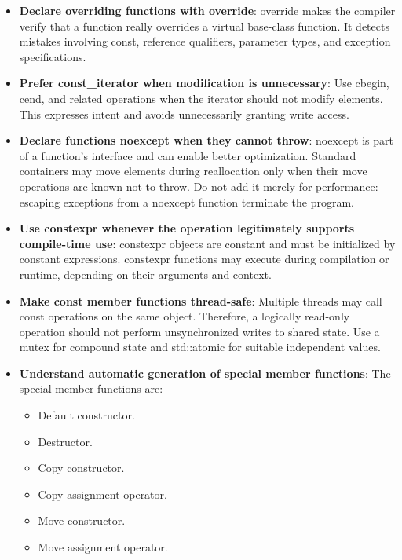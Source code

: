\documentclass{report}
\begin{document}
    \pagebreak 
    \begin{itemize}
        \item \textbf{Declare overriding functions with override}: override makes the compiler verify that a function really overrides a virtual base-class function. It detects mistakes involving const, reference qualifiers, parameter types, and exception specifications.
        \item \textbf{Prefer const\_iterator when modification is unnecessary}: Use cbegin, cend, and related operations when the iterator should not modify elements. This expresses intent and avoids unnecessarily granting write access.
        \item \textbf{Declare functions noexcept when they cannot throw}: noexcept is part of a function’s interface and can enable better optimization. Standard containers may move elements during reallocation only when their move operations are known not to throw.
            \bigbreak \noindent 
            Do not add it merely for performance: escaping exceptions from a noexcept function terminate the program.
        \item \textbf{Use constexpr whenever the operation legitimately supports compile-time use}: constexpr objects are constant and must be initialized by constant expressions. constexpr functions may execute during compilation or runtime, depending on their arguments and context.
        \item \textbf{Make const member functions thread-safe}: Multiple threads may call const operations on the same object. Therefore, a logically read-only operation should not perform unsynchronized writes to shared state.
            \bigbreak \noindent 
            Use a mutex for compound state and std::atomic for suitable independent values.
        \item \textbf{Understand automatic generation of special member functions}: The special member functions are:
            \begin{itemize}
                \item Default constructor.
                \item Destructor.
                \item Copy constructor.
                \item Copy assignment operator.
                \item Move constructor.
                \item Move assignment operator.
            \end{itemize}

\end{itemize}
\end{document}
